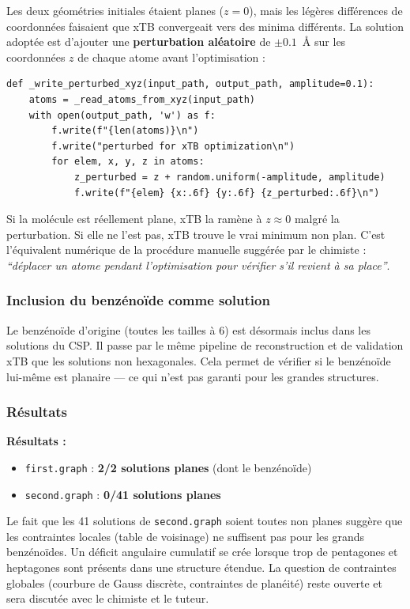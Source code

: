 \documentclass[12pt,a4paper]{article}
\theoremstyle{definition}
\begin{document}
Les deux géométries initiales étaient planes ($z = 0$), mais les légères différences de
coordonnées faisaient que xTB convergeait vers des minima différents. La solution adoptée
est d'ajouter une \textbf{perturbation aléatoire} de $\pm 0.1$~\AA{} sur les coordonnées $z$
de chaque atome avant l'optimisation :

\begin{lstlisting}
def _write_perturbed_xyz(input_path, output_path, amplitude=0.1):
    atoms = _read_atoms_from_xyz(input_path)
    with open(output_path, 'w') as f:
        f.write(f"{len(atoms)}\n")
        f.write("perturbed for xTB optimization\n")
        for elem, x, y, z in atoms:
            z_perturbed = z + random.uniform(-amplitude, amplitude)
            f.write(f"{elem} {x:.6f} {y:.6f} {z_perturbed:.6f}\n")
\end{lstlisting}

Si la molécule est réellement plane, xTB la ramène à $z \approx 0$ malgré la perturbation.
Si elle ne l'est pas, xTB trouve le vrai minimum non plan. C'est l'équivalent numérique de la
procédure manuelle suggérée par le chimiste : \textit{``déplacer un atome pendant l'optimisation
pour vérifier s'il revient à sa place''}.

\subsubsection{Inclusion du benzénoïde comme solution}

Le benzénoïde d'origine (toutes les tailles à 6) est désormais inclus dans les solutions du
CSP. Il passe par le même pipeline de reconstruction et de validation xTB que les solutions
non hexagonales. Cela permet de vérifier si le benzénoïde lui-même est planaire — ce qui n'est
pas garanti pour les grandes structures.

\subsubsection{Résultats}

\textbf{Résultats :}
\begin{itemize}
  \item \texttt{first.graph} : \textbf{2/2 solutions planes} (dont le benzénoïde)
  \item \texttt{second.graph} : \textbf{0/41 solutions planes}
\end{itemize}

\begin{remarque}
  Le fait que les 41 solutions de \texttt{second.graph} soient toutes non planes suggère que
  les contraintes locales (table de voisinage) ne suffisent pas pour les grands benzénoïdes.
  Un déficit angulaire cumulatif se crée lorsque trop de pentagones et heptagones sont présents
  dans une structure étendue. La question de contraintes globales (courbure de Gauss discrète,
  contraintes de planéité) reste ouverte et sera discutée avec le chimiste et le tuteur.
\end{remarque}
\end{document}
